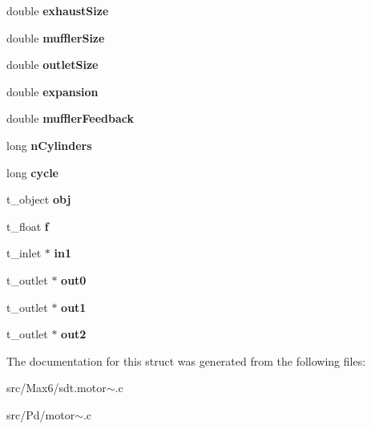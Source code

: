 \begin{DoxyCompactItemize}
\item 
\hypertarget{struct__motor_ab99d1ef8e4d661a4b8c4583dae44dd15}{}double {\bfseries exhaust\+Size}\label{struct__motor_ab99d1ef8e4d661a4b8c4583dae44dd15}

\item 
\hypertarget{struct__motor_aa49736cb1fe597fbf1787ff60966a199}{}double {\bfseries muffler\+Size}\label{struct__motor_aa49736cb1fe597fbf1787ff60966a199}

\item 
\hypertarget{struct__motor_abece54b750d8d97fd6c028408c19de6d}{}double {\bfseries outlet\+Size}\label{struct__motor_abece54b750d8d97fd6c028408c19de6d}

\item 
\hypertarget{struct__motor_a0cf56c865603dee99d882799fc429e01}{}double {\bfseries expansion}\label{struct__motor_a0cf56c865603dee99d882799fc429e01}

\item 
\hypertarget{struct__motor_a7b4e5bad495d2d0cce989a067a71be60}{}double {\bfseries muffler\+Feedback}\label{struct__motor_a7b4e5bad495d2d0cce989a067a71be60}

\item 
\hypertarget{struct__motor_a4d448c1a1da40b144384904bd98fc450}{}long {\bfseries n\+Cylinders}\label{struct__motor_a4d448c1a1da40b144384904bd98fc450}

\item 
\hypertarget{struct__motor_aa15845880dc78521e35d9e926d30ed25}{}long {\bfseries cycle}\label{struct__motor_aa15845880dc78521e35d9e926d30ed25}

\item 
\hypertarget{struct__motor_a21775ab6bc98b0961a6e9fd9d832e65b}{}t\+\_\+object {\bfseries obj}\label{struct__motor_a21775ab6bc98b0961a6e9fd9d832e65b}

\item 
\hypertarget{struct__motor_a73198eb29c82f0df575e45396b68c18c}{}t\+\_\+float {\bfseries f}\label{struct__motor_a73198eb29c82f0df575e45396b68c18c}

\item 
\hypertarget{struct__motor_a10a16d82168f65ea70919072c6fbcaf4}{}t\+\_\+inlet $\ast$ {\bfseries in1}\label{struct__motor_a10a16d82168f65ea70919072c6fbcaf4}

\item 
\hypertarget{struct__motor_a6af9a9095f07d4ff9044afa8f70690da}{}t\+\_\+outlet $\ast$ {\bfseries out0}\label{struct__motor_a6af9a9095f07d4ff9044afa8f70690da}

\item 
\hypertarget{struct__motor_a0911a1b2754eb05fc43835c9f25e805c}{}t\+\_\+outlet $\ast$ {\bfseries out1}\label{struct__motor_a0911a1b2754eb05fc43835c9f25e805c}

\item 
\hypertarget{struct__motor_ae990a5646d2ab7a21447c5d343b9ee72}{}t\+\_\+outlet $\ast$ {\bfseries out2}\label{struct__motor_ae990a5646d2ab7a21447c5d343b9ee72}

\end{DoxyCompactItemize}


The documentation for this struct was generated from the following files\+:\begin{DoxyCompactItemize}
\item 
src/\+Max6/sdt.\+motor$\sim$.\+c\item 
src/\+Pd/motor$\sim$.\+c\end{DoxyCompactItemize}
